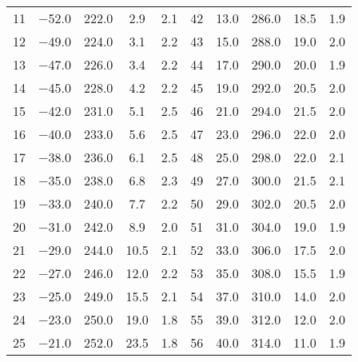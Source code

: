 \begin{table}
\begin{tabular}{S S S S S | S S S S S}
        \num{11} &  \num{-52.0} &  \num{222.0} &  \num{ 2.9} &  \num{2.1} & \num{42} &  \num{ 13.0} &  \num{286.0} &  \num{18.5} &  \num{1.9} \\
        \num{12} &  \num{-49.0} &  \num{224.0} &  \num{ 3.1} &  \num{2.2} & \num{43} &  \num{ 15.0} &  \num{288.0} &  \num{19.0} &  \num{2.0} \\
        \num{13} &  \num{-47.0} &  \num{226.0} &  \num{ 3.4} &  \num{2.2} & \num{44} &  \num{ 17.0} &  \num{290.0} &  \num{20.0} &  \num{1.9} \\
        \num{14} &  \num{-45.0} &  \num{228.0} &  \num{ 4.2} &  \num{2.2} & \num{45} &  \num{ 19.0} &  \num{292.0} &  \num{20.5} &  \num{2.0} \\
        \num{15} &  \num{-42.0} &  \num{231.0} &  \num{ 5.1} &  \num{2.5} & \num{46} &  \num{ 21.0} &  \num{294.0} &  \num{21.5} &  \num{2.0} \\
        \num{16} &  \num{-40.0} &  \num{233.0} &  \num{ 5.6} &  \num{2.5} & \num{47} &  \num{ 23.0} &  \num{296.0} &  \num{22.0} &  \num{2.0} \\
        \num{17} &  \num{-38.0} &  \num{236.0} &  \num{ 6.1} &  \num{2.5} & \num{48} &  \num{ 25.0} &  \num{298.0} &  \num{22.0} &  \num{2.1} \\
        \num{18} &  \num{-35.0} &  \num{238.0} &  \num{ 6.8} &  \num{2.3} & \num{49} &  \num{ 27.0} &  \num{300.0} &  \num{21.5} &  \num{2.1} \\
        \num{19} &  \num{-33.0} &  \num{240.0} &  \num{ 7.7} &  \num{2.2} & \num{50} &  \num{ 29.0} &  \num{302.0} &  \num{20.5} &  \num{2.0} \\
        \num{20} &  \num{-31.0} &  \num{242.0} &  \num{ 8.9} &  \num{2.0} & \num{51} &  \num{ 31.0} &  \num{304.0} &  \num{19.0} &  \num{1.9} \\
        \num{21} &  \num{-29.0} &  \num{244.0} &  \num{10.5} &  \num{2.1} & \num{52} &  \num{ 33.0} &  \num{306.0} &  \num{17.5} &  \num{2.0} \\
        \num{22} &  \num{-27.0} &  \num{246.0} &  \num{12.0} &  \num{2.2} & \num{53} &  \num{ 35.0} &  \num{308.0} &  \num{15.5} &  \num{1.9} \\
        \num{23} &  \num{-25.0} &  \num{249.0} &  \num{15.5} &  \num{2.1} & \num{54} &  \num{ 37.0} &  \num{310.0} &  \num{14.0} &  \num{2.0} \\
        \num{24} &  \num{-23.0} &  \num{250.0} &  \num{19.0} &  \num{1.8} & \num{55} &  \num{ 39.0} &  \num{312.0} &  \num{12.0} &  \num{2.0} \\
        \num{25} &  \num{-21.0} &  \num{252.0} &  \num{23.5} &  \num{1.8} & \num{56} &  \num{ 40.0} &  \num{314.0} &  \num{11.0} &  \num{1.9} \\

\end{tabular}
\end{table}

